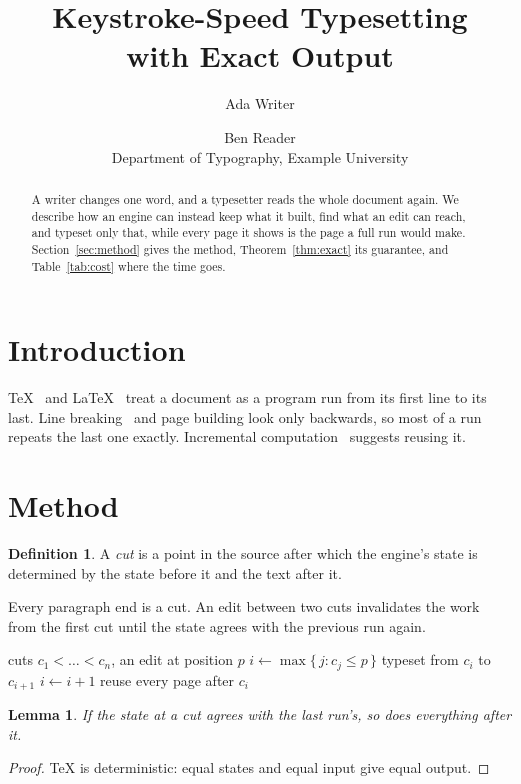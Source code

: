 \documentclass[10pt,twocolumn]{article}
\title{\bfseries Keystroke-Speed Typesetting\\[2pt] \large with Exact Output}
\author{Ada Writer \and Ben Reader\\[2pt] \small Department of Typography, Example University}
\date{}
\newtheorem{lemma}[theorem]{Lemma}
\theoremstyle{definition}
\newtheorem{definition}[theorem]{Definition}
\begin{document}
\maketitle

\begin{abstract}
A writer changes one word, and a typesetter reads the whole document again.
We describe how an engine can instead keep what it built, find what an edit
can reach, and typeset only that, while every page it shows is the page a
full run would make. Section~\ref{sec:method} gives the method,
Theorem~\ref{thm:exact} its guarantee, and Table~\ref{tab:cost} where the
time goes.
\end{abstract}

\section{Introduction}
\label{sec:intro}
TeX~\cite{knuth84} and \LaTeX~\cite{lamport94} treat a document as a program
run from its first line to its last. Line breaking~\cite{knuthplass81} and
page building look only backwards, so most of a run repeats the last one
exactly. Incremental computation~\cite{acar05} suggests reusing it.

\section{Method}
\label{sec:method}
\begin{definition}
A \emph{cut} is a point in the source after which the engine's state is
determined by the state before it and the text after it.
\end{definition}
Every paragraph end is a cut. An edit between two cuts invalidates the work
from the first cut until the state agrees with the previous run again.

\begin{algorithm}[h]
\caption{Rebuild after an edit}
\label{alg:rebuild}
\begin{algorithmic}[1]
\Require cuts $c_1<\dots<c_n$, an edit at position $p$
\State $i \gets \max\{\, j : c_j \le p \,\}$
\Repeat
  \State typeset from $c_i$ to $c_{i+1}$
  \State $i \gets i + 1$
\State reuse every page after $c_i$
\end{algorithmic}
\end{algorithm}

\begin{lemma}
\label{lem:agree}
If the state at a cut agrees with the last run's, so does everything after it.
\end{lemma}
\begin{proof}
TeX is deterministic: equal states and equal input give equal output.
\end{proof}
\end{document}
